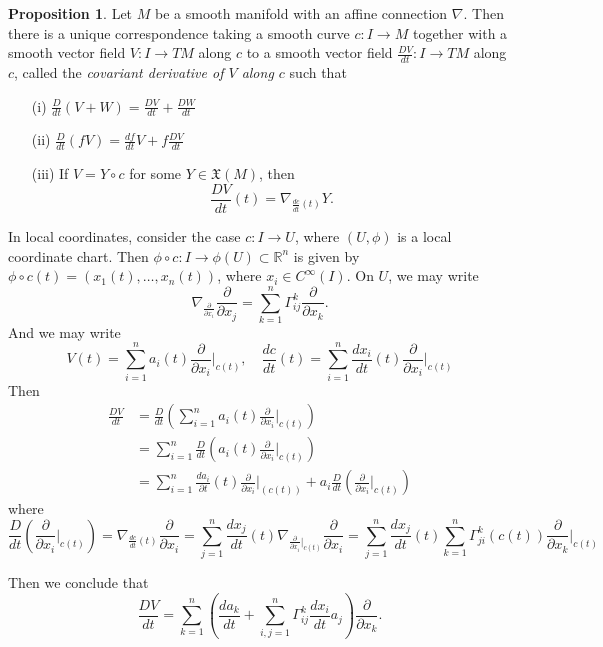 \documentclass{amsart}
\numberwithin{equation}{section}
\newcommand{\bR}{\mathbb{R}}
\newcommand{\fX}{\mathfrak{X}}
\theoremstyle{definition}
\theoremstyle{theorem}
\newtheorem{proposition}[definition]{Proposition}
\begin{document}
\begin{proposition}\label{DV-inner-product}
Let $M$ be a smooth manifold with an affine connection $\nabla$. Then there is a unique correspondence taking a smooth curve $c:I\to M$ together with a smooth vector field $V:I\to TM$ along $c$ to a smooth vector field $\frac{DV}{dt} : I\to TM$  along $c$,  called the {\em covariant derivative of $V$ along $c$} such that 
\begin{enumerate}
\item[(i)] $\frac{D}{dt}(V + W) = \frac{DV}{dt} + \frac{DW}{dt}$ 
\item[(ii)] $\frac{D}{dt}(fV) = \frac{df}{dt}V + f \frac{DV}{dt}$ 
\item[(iii)] If $V = Y \circ c$ for some $Y \in \fX(M)$, then 
$$
\frac{DV}{dt}(t) = \nabla_{\frac{dc}{dt}(t)}Y.
$$ 
\end{enumerate}
\end{proposition}

In local coordinates, consider the case $c :I \to U$, where $(U,\phi)$ is a local coordinate chart.
Then $\phi\circ c: I\to \phi(U)\subset \bR^n$ is given by 
$\phi\circ c(t)= (x_1(t),\ldots, x_n(t))$, where $x_i\in C^\infty(I)$.
 On $U$, we may write 
\[
\nabla_{\frac{\partial}{\partial x_i}}\frac{\partial}{\partial x_j} = \sum_{k=1}^n \Gamma_{ij}^k \frac{\partial}{\partial x_k}.
\]
And we may write 
\[
V(t) = \sum_{i=1}^n a_i(t) \frac{\partial}{\partial x_i}\Big|_{c(t)}, \quad
\frac{dc}{dt}(t)=\sum_{i=1}^n \frac{dx_i}{dt}(t) \frac{\partial}{\partial x_i}\Big|_{c(t)}
\] 
Then 
\begin{align*}
\frac{DV}{dt} &= \frac{D}{dt} \left(\sum_{i=1}^n a_i(t) \frac{\partial}{\partial x_i}\Big|_{c(t)}\right) \\
&= \sum_{i=1}^n \frac{D}{dt}(a_i(t) \frac{\partial}{\partial x_i}\Big|_{c(t)}) \\
&= \sum_{i=1}^n \frac{d a_i}{\partial t}(t) \frac{\partial}{\partial x_i}\Big|_{(c(t))} + 
a_i \frac{D}{dt}(\frac{\partial}{\partial x_i}\Big|_{c(t)}) 
\end{align*}
where 
\[
\frac{D}{dt}(\frac{\partial}{\partial x_i}|_{c(t)})  = 
\nabla_{\frac{dc}{dt}(t)} \frac{\partial}{\partial x_i} =
\sum_{j=1}^n \frac{dx_j}{dt}(t)
\nabla_{\frac{\partial}{\partial x_i}|_{c(t)}}\frac{\partial}{\partial x_i}
=\sum_{j=1}^n \frac{dx_j}{dt}(t)\sum_{k=1}^n \Gamma_{ji}^k(c(t)) \frac{\partial}{\partial x_k}\Big|_{c(t)}
\]

Then we conclude that 
\[
\frac{DV}{dt} = \sum_{k=1}^n \left(\frac{da_k}{dt} + \sum_{i,j=1}^n \Gamma_{ij}^k \frac{dx_i}{dt}a_j\right)\frac{\partial}{\partial x_k}.
\]
\end{document}
